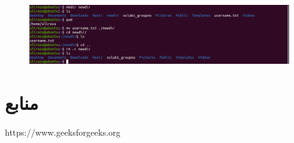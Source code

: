 \documentclass{article}
\begin{document}
\section{}
\begin{figure}[ht]
    \centering
    \includegraphics[width=1.0\textwidth]{figures/8.png}
    \caption{}
    \label{fig:fig1}
\end{figure}
\FloatBarrier

\section*{منابع}
\renewcommand{\section}[2]{}%
\begin{thebibliography}{99} %


\begin{LTRitems}

\resetlatinfont

 https://www.geeksforgeeks.org
\end{LTRitems}

\end{thebibliography}
\end{document}
